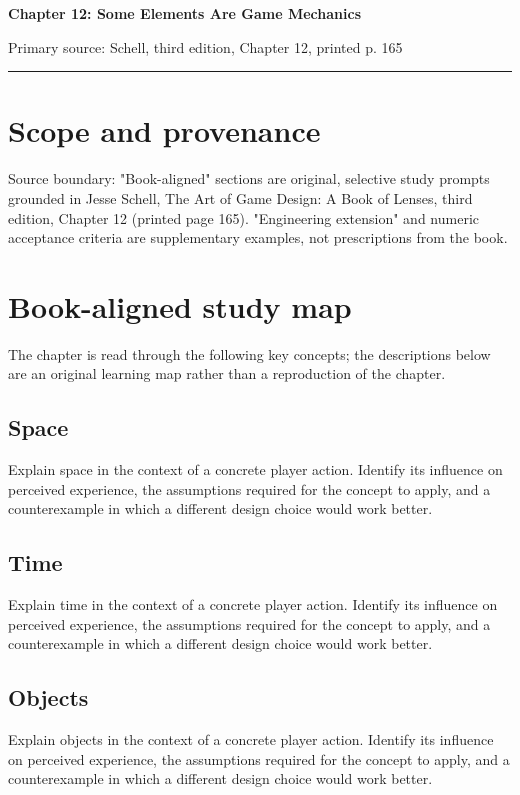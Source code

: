 \documentclass[11pt]{article}
\begin{document}
{\huge\bfseries\color{suiteblue} Chapter 12: Some Elements Are Game Mechanics}\par
\vspace{0.15in}
{\normalsize\color{suitegray} Primary source: Schell, third edition, Chapter 12, printed p. 165}\par
\vspace{0.15in}\hrule\vspace{0.15in}

\section{Scope and provenance}
Source boundary: "Book-aligned" sections are original, selective study prompts grounded in Jesse Schell, The Art of Game Design: A Book of Lenses, third edition, Chapter 12 (printed page 165). "Engineering extension" and numeric acceptance criteria are supplementary examples, not prescriptions from the book.


\section{Book-aligned study map}
The chapter is read through the following key concepts; the descriptions below are an original learning map rather than a reproduction of the chapter.


\subsection{Space}
Explain space in the context of a concrete player action. Identify its influence on perceived experience, the assumptions required for the concept to apply, and a counterexample in which a different design choice would work better.


\subsection{Time}
Explain time in the context of a concrete player action. Identify its influence on perceived experience, the assumptions required for the concept to apply, and a counterexample in which a different design choice would work better.


\subsection{Objects}
Explain objects in the context of a concrete player action. Identify its influence on perceived experience, the assumptions required for the concept to apply, and a counterexample in which a different design choice would work better.
\end{document}
